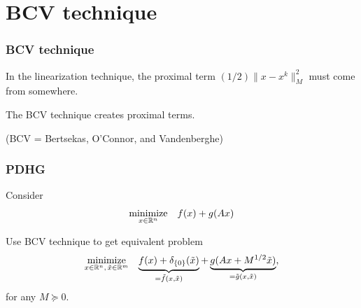 \documentclass[10pt,mathserif]{beamer}
\begin{document}
\section{BCV technique}


\begin{frame}
\frametitle{BCV technique}
In the linearization technique, the proximal term $(1/2)\|x-x^k\|^2_M$ must come from somewhere.

\vspace{0.2in}
The BCV technique creates proximal terms.


\vspace{0.2in}
(BCV = Bertsekas, O'Connor, and Vandenberghe)

\end{frame}



\begin{frame}
\frametitle{PDHG}
Consider 
\[
\begin{array}{ll}
\underset{x\in \mathbb{R}^n}{\mbox{minimize}}&f(x)+g(Ax)
\end{array}
\]

\vspace{0.2in}
Use BCV technique to get equivalent problem
\[
\begin{array}{ll}
\underset{x\in \mathbb{R}^n,\,\tilde{x}\in \mathbb{R}^m}{\mbox{minimize}}&
\underbrace{f(x)+
\delta_{\{0\}}(\tilde{x})}_{=\tilde{f}(x,\tilde{x})}
+\underbrace{g(Ax+M^{1/2}\tilde{x})}_{=\tilde{g}(x,\tilde{x})},
\end{array}
\]
for any  $M\succeq 0$.
\vspace{0.2in}


 \end{frame}
\end{document}
